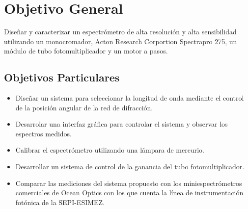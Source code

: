 \chapter*{Objetivo General}
Diseñar y caracterizar un espectrómetro de alta resolución y alta sensibilidad utilizando un monocromador, Acton Research Corportion Spectrapro 275,  un módulo de tubo fotomultiplicador y un motor a pasos.
\section*{Objetivos Particulares}
\begin{itemize}
\item Diseñar un sistema para seleccionar la longitud de onda mediante el control de la posición angular de la red de difracción.

\item Desarrolar una interfaz gráfica para controlar el sistema y observar los espectros medidos.

\item Calibrar el espectrómetro utilizando una lámpara de mercurio.

\item Desarrollar un sistema de control de la ganancia del tubo fotomultiplicador.

\item Comparar las mediciones del sistema propuesto con los miniespectrómetros comerciales de Ocean Optics con los que cuenta la línea de instrumentación fotónica de la SEPI-ESIMEZ.
\end{itemize}
